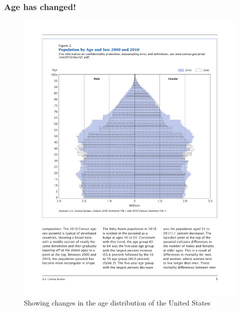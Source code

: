 \documentclass{beamer}
\begin{document}
\frame
{
  \frametitle{Age has changed!}

\begin{figure}[htbp]
\begin{center}
\includegraphics[scale=0.3]{Pyramid.pdf}
\caption{Showing changes in the age distribution of the United States}
\end{center}
\end{figure}


}
\end{document}
